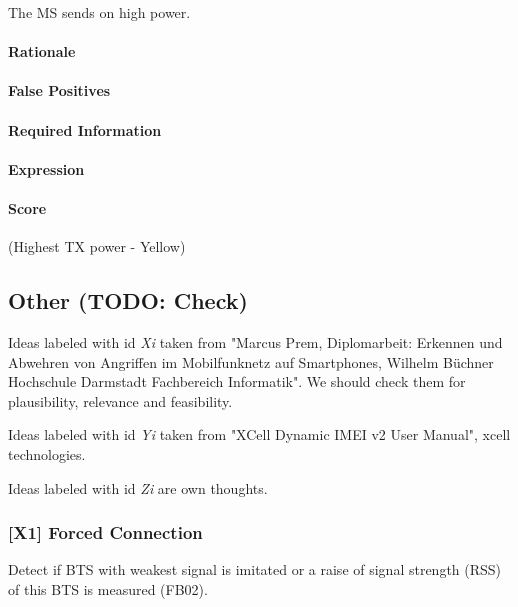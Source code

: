 \documentclass[a4paper,11pt,notitlepage,bigheadings,oneside]{scrartcl}
\begin{document}
The MS sends on high power.

\paragraph{Rationale}

\TBD{}

\paragraph{False Positives}

\TBD{}

\paragraph{Required Information}

\TBD{}

\paragraph{Expression}

\TBD{}

\paragraph{Score}

\TBD{} (Highest TX power - Yellow)


\subsection{Other (TODO: Check)}

Ideas labeled with id \emph{Xi} taken from "Marcus Prem, Diplomarbeit: Erkennen
und Abwehren von Angriffen im Mobilfunknetz auf Smartphones, Wilhelm Büchner
Hochschule Darmstadt Fachbereich Informatik". We should check them for
plausibility, relevance and feasibility.

Ideas labeled with id \emph{Yi} taken from "XCell Dynamic IMEI v2 User Manual",
xcell technologies.

Ideas labeled with id \emph{Zi} are own thoughts.

\subsubsection{[X1] Forced Connection}

Detect if BTS with weakest signal is imitated or a  raise of signal strength
(RSS) of this BTS is measured (FB02).
\end{document}
